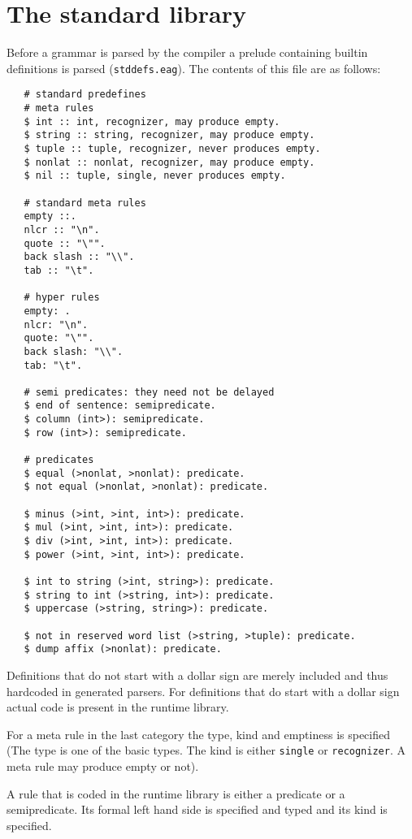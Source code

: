 \section {The standard library}
Before a grammar is parsed by the \EAG compiler a prelude containing
builtin definitions is parsed ({\tt stddefs.eag}). The contents
of this file are as follows:
\begin{verbatim}
   # standard predefines
   # meta rules
   $ int :: int, recognizer, may produce empty.
   $ string :: string, recognizer, may produce empty.
   $ tuple :: tuple, recognizer, never produces empty.
   $ nonlat :: nonlat, recognizer, may produce empty.
   $ nil :: tuple, single, never produces empty.

   # standard meta rules
   empty ::.
   nlcr :: "\n".
   quote :: "\"".
   back slash :: "\\".
   tab :: "\t".

   # hyper rules
   empty: .
   nlcr: "\n".
   quote: "\"".
   back slash: "\\".
   tab: "\t".

   # semi predicates: they need not be delayed
   $ end of sentence: semipredicate.
   $ column (int>): semipredicate.
   $ row (int>): semipredicate.

   # predicates
   $ equal (>nonlat, >nonlat): predicate.
   $ not equal (>nonlat, >nonlat): predicate.

   $ minus (>int, >int, int>): predicate.
   $ mul (>int, >int, int>): predicate.
   $ div (>int, >int, int>): predicate.
   $ power (>int, >int, int>): predicate.

   $ int to string (>int, string>): predicate.
   $ string to int (>string, int>): predicate.
   $ uppercase (>string, string>): predicate.

   $ not in reserved word list (>string, >tuple): predicate.
   $ dump affix (>nonlat): predicate.
\end{verbatim}
Definitions that do not start with a dollar sign are merely included
and thus hardcoded in generated parsers. For definitions that do start
with a dollar sign actual code is present in the \EAG runtime library.

For a meta rule in the last category the type, kind and emptiness is
specified (The type is one of the basic types. The kind is
either {\tt single} or {\tt recognizer}. A meta rule may produce
empty or not).

A rule that is coded in the runtime library is either a predicate
or a semipredicate. Its formal left hand side is specified and
typed and its kind is specified.
